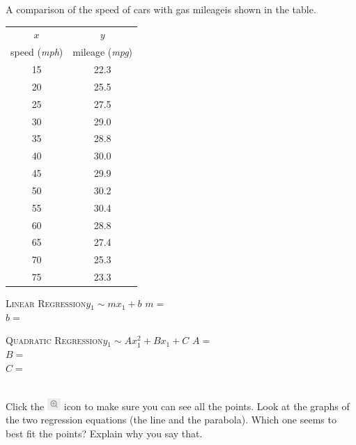 \documentclass[12pt,letterpaper]{memoir}
\begin{document}
\myWideProblemWithContent 
{
    A comparison of the speed of cars with gas mileageis 
    shown in the table.\\[0.5em]
    \begin{minipage}{0.35\textwidth}
        \footnotesize
        \begin{tabular}{cc}
            $x$ & $y$ \\ 
            speed ({\itshape mph}) & mileage ({\itshape mpg}) \\
            \midrule 
            15 & 22.3 \\
            20 & 25.5 \\ 
            25 & 27.5 \\ 
            30 & 29.0 \\ 
            35 & 28.8 \\ 
            40 & 30.0 \\ 
            45 & 29.9 \\ 
            50 & 30.2 \\ 
            55 & 30.4 \\ 
            60 & 28.8 \\ 
            65 & 27.4 \\ 
            70 & 25.3 \\ 
            75 & 23.3 \\ 
            \bottomrule
        \end{tabular}
        \end{minipage}
    \begin{minipage}{0.64\textwidth}
        \begin{tcolorbox}[colback=white,width=\textwidth]
            \small
            \scshape{Linear Regression}\hfill$y_1 \sim m x_1 + b$
            \tcblower
            $m =$  \\
            $b =$ 
        \end{tcolorbox}
        \begin{tcolorbox}[colback=white,width=\textwidth]
            \small
            \scshape{Quadratic Regression}\hfill$y_1 \sim A x_1^2 + B x_1 + C$
            \tcblower
            $A =$  \\
            $B =$ \\
            $C =$ 
        \end{tcolorbox}
    \end{minipage}\\[1\onelineskip]
    Click the 
    \includegraphics[width=0.2in]{magnifying-glass-plus.png} 
    icon to make sure you can see all the points.
    Look at the graphs of the two regression equations 
    (the line and the parabola).
    Which one seems to best fit the points?
    Explain why you say that.
    \vspace{0.7in}
}
\end{document}
